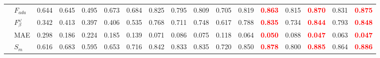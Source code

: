 \documentclass[runningheads]{llncs}
\begin{document}
\begin{table}[t]
{\begin{tabular}{@{}rl|ccccccccccc|cc|cc@{}}
    & $F_{ada}$            & 0.644                                     & 0.645                                       & 0.495                                       & 0.673                                  & 0.684                                      & 0.825                                          & 0.795                                      & 0.809                                        & 0.705                                            & 0.819                                      & \textcolor{red}{\textbf{0.863}} & 0.815                                          & \textcolor{red}{\textbf{0.870}} & 0.831                                     & \textcolor{red}{\textbf{0.875}} \\
    & $F_{\beta}^{\omega}$ & 0.342                                     & 0.413                                       & 0.397                                       & 0.406                                  & 0.535                                      & 0.768                                          & 0.711                                      & 0.748                                        & 0.617                                            & 0.788                                      & \textcolor{red}{\textbf{0.835}} & 0.734                                          & \textcolor{red}{\textbf{0.844}} & 0.793                                     & \textcolor{red}{\textbf{0.848}} \\
    & MAE                  & 0.298                                     & 0.186                                       & 0.224                                       & 0.185                                  & 0.139                                      & 0.071                                          & 0.086                                      & 0.075                                        & 0.118                                            & 0.064                                      & \textcolor{red}{\textbf{0.050}} & 0.088                                          & \textcolor{red}{\textbf{0.047}} & 0.063                                     & \textcolor{red}{\textbf{0.047}} \\
    & $S_{m}$              & 0.616                                     & 0.683                                       & 0.595                                       & 0.653                                  & 0.716                                      & 0.842                                          & 0.833                                      & 0.835                                        & 0.720                                            & 0.850                                      & \textcolor{red}{\textbf{0.878}} & 0.800                                          & \textcolor{red}{\textbf{0.885}} & 0.864                                     & \textcolor{red}{\textbf{0.886}} \\

\end{tabular}}
\end{table}
\end{document}
